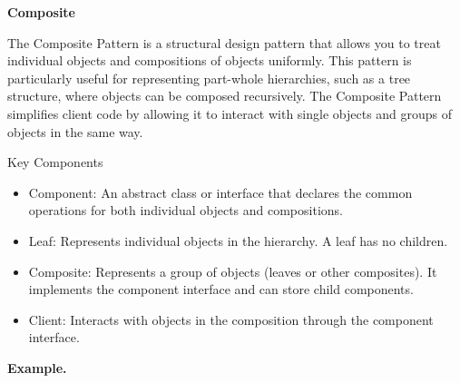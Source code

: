 \medskip
\begin{center}
\textbf{Composite}
\end{center}

The Composite Pattern is a structural design pattern that allows you to treat individual objects and compositions of objects uniformly. This pattern is particularly useful for representing part-whole hierarchies, such as a tree structure, where objects can be composed recursively. The Composite Pattern simplifies client code by allowing it to interact with single objects and groups of objects in the same way.

Key Components

\begin{itemize}
\item Component: An abstract class or interface that declares the common operations for both individual objects and compositions.

\item Leaf: Represents individual objects in the hierarchy. A leaf has no children.

\item Composite: Represents a group of objects (leaves or other composites). It implements the component interface and can store child components.

\item Client: Interacts with objects in the composition through the component interface.
\end{itemize}

\textbf{Example.}

